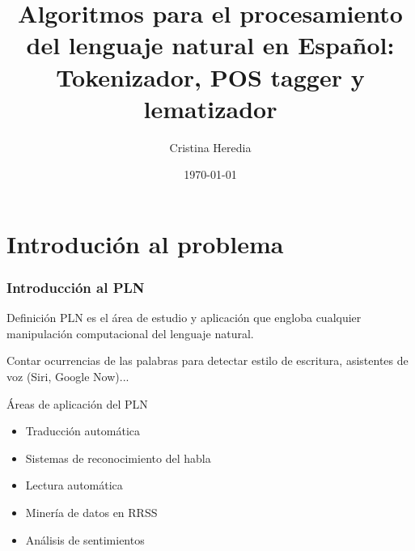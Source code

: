 \documentclass{beamer}
\title[Tokenizador, Pos tagger y lematizador]{Algoritmos para el procesamiento del lenguaje natural en Español: Tokenizador, POS tagger y lematizador} %
\author{Cristina Heredia} %
\institute[UGR] %
{
Trabajo fin de grado en Ingeniería informática \\ %
\medskip
\textit{Universidad de Granada} %
}
\date{\today} %
\begin{document}
\begin{frame}
\titlepage %
\end{frame}



\section{Introdución al problema } %


\begin{frame}
\frametitle{Introducción al PLN}
\begin{block}{Definición}
PLN es el área de estudio y aplicación que engloba cualquier manipulación computacional del lenguaje natural. 
\end{block}
\begin{example}
Contar ocurrencias de las palabras para detectar estilo de escritura, asistentes de voz (Siri, Google Now)...
\end{example}

\begin{block}{Áreas de aplicación del PLN}
\begin{itemize}
\item Traducción automática
\item Sistemas de reconocimiento del habla
\item Lectura automática
\item Minería de datos en RRSS
\item Análisis de sentimientos
\end{itemize}
\end{block}
\end{frame}
\end{document}
